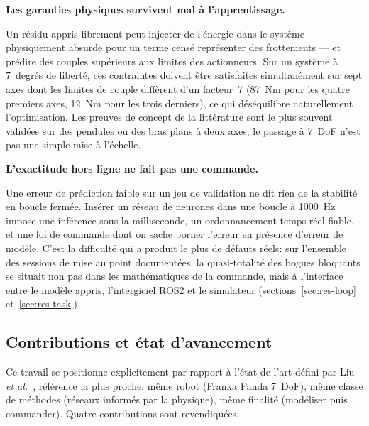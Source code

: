 \documentclass[a4paper, oneside]{article}
\newcommand{\parag}[1]{%
    \par\medskip\noindent\textbf{#1}\ \ignorespaces%
}
\begin{document}
\parag{Les garanties physiques survivent mal à l'apprentissage.}
Un résidu appris librement peut injecter de l'énergie dans le système —
physiquement absurde pour un terme censé représenter des frottements — et
prédire des couples supérieurs aux limites des actionneurs. Sur un système à
7~degrés de liberté, ces contraintes doivent être satisfaites simultanément sur
sept axes dont les limites de couple diffèrent d'un facteur~7 (\SI{87}{Nm}
pour les quatre premiers axes, \SI{12}{Nm} pour les trois derniers), ce qui
déséquilibre
naturellement l'optimisation. Les preuves de concept de la littérature sont le
plus souvent validées sur des pendules ou des bras plans à deux axes; le
passage à 7~DoF n'est pas une simple mise à l'échelle.

\parag{L'exactitude hors ligne ne fait pas une commande.}
Une erreur de prédiction faible sur un jeu de validation ne dit rien de la
stabilité en boucle fermée. Insérer un réseau de neurones dans une boucle à
\SI{1000}{Hz} impose une inférence sous la milliseconde, un ordonnancement temps réel
fiable, et une loi de commande dont on sache borner l'erreur en présence
d'erreur de modèle. C'est la difficulté qui a produit le plus de défauts réels:
sur l'ensemble des sessions de mise au point documentées, la quasi-totalité des
bogues bloquants se situait non pas dans les mathématiques de la commande, mais
à l'interface entre le modèle appris, l'intergiciel ROS2 et le simulateur
(sections~\ref{sec:res-loop} et~\ref{sec:res-task}).

\subsection{Contributions et état d'avancement}
\label{sec:contributions}

Ce travail se positionne explicitement par rapport à l'état de l'art défini par
Liu \emph{et al.}~\cite{liu2024}, référence la plus proche: même robot (Franka
Panda 7~DoF), même classe de méthodes (réseaux informés par la physique), même
finalité (modéliser puis commander). Quatre contributions sont revendiquées.
\end{document}
